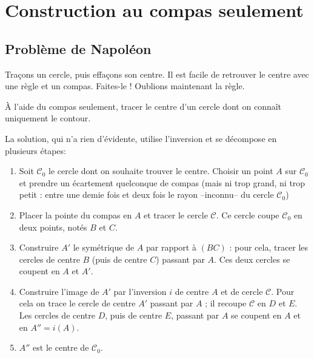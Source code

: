 \documentclass[11pt,class=report,crop=false]{standalone}
\newcommand{\inversion}{i}
\begin{document}
\section{Construction au compas seulement}

\subsection{Problème de Napoléon}

Traçons un cercle, puis effaçons son centre. Il est facile de retrouver le centre avec une règle
et un compas. Faites-le ! Oublions maintenant la règle. 

  \`A l'aide du compas seulement, 
tracer le centre d'un cercle dont on connaît uniquement le contour.

La solution, qui n'a rien d'évidente, utilise l'inversion et se décompose en plusieurs étapes:
\begin{enumerate}
  \item Soit $\mathcal{C}_0$ le cercle dont on souhaite trouver le centre. Choisir un point $A$ sur
  $\mathcal{C}_0$ et prendre un écartement quelconque de compas (mais ni trop grand, ni trop petit :
  entre une demie fois et deux fois le rayon --inconnu-- du cercle $\mathcal{C}_0$)

 
  \item Placer la pointe du compas en $A$ et tracer le cercle $\mathcal{C}$. Ce cercle coupe $\mathcal{C}_0$ en deux points, notés
  $B$ et $C$.
 
  \item Construire $A'$ le symétrique de $A$ par rapport à $(BC)$ : pour cela, tracer
  les cercles de centre $B$ (puis de centre $C$) passant par $A$. Ces deux cercles se coupent en $A$ et $A'$.
  
  \item Construire l'image de $A'$ par l'inversion $\inversion$ de centre $A$ et de cercle $\mathcal{C}$.
  Pour cela on trace le cercle de centre $A'$ passant par $A$ ; il recoupe $\mathcal{C}$ en $D$ et $E$.
  Les cercles de centre $D$, puis de centre $E$, passant par $A$ se coupent en $A$ et en $A''=\inversion(A)$.
  
  
  \item $A''$ est le centre de $\mathcal{C}_0$. 
\end{enumerate}
\end{document}
